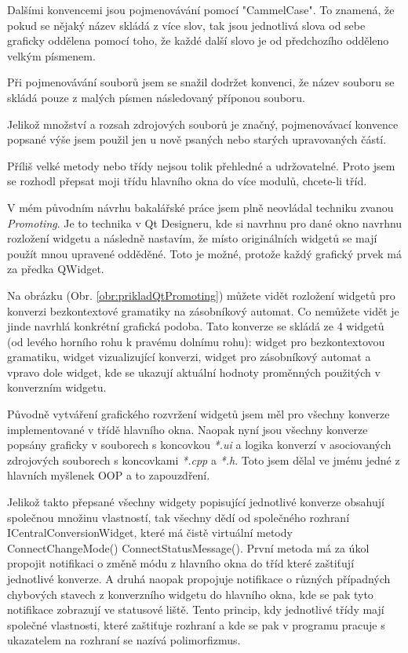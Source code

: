 Dalšími konvencemi jsou pojmenovávání pomocí "CammelCase". To znamená, že pokud se nějaký název skládá z více slov, tak jsou jednotlivá slova od sebe graficky oddělena pomocí toho, že každé další slovo je od předchozího odděleno velkým písmenem.

Při pojmenovávání souborů jsem se snažil dodržet konvenci, že název souboru se skládá pouze z malých písmen následovaný příponou souboru.

Jelikož množství a rozsah zdrojových souborů je značný, pojmenovávací konvence popsané výše jsem použil jen u nově psaných nebo starých upravovaných částí. 


Příliš velké metody nebo třídy nejsou tolik přehledné a udržovatelné. Proto jsem se rozhodl přepsat moji třídu hlavního okna do více modulů, chcete-li tříd.

V mém původním návrhu bakalářské práce jsem plně neovládal techniku zvanou \textit{Promoting}. Je to technika v Qt Designeru, kde si navrhnu pro dané okno navrhnu rozložení widgetu a následně nastavím, že místo originálních widgetů se mají použít mnou upravené odděděné. Toto je možné, protože každý grafický prvek má za předka QWidget.


Na obrázku (Obr. \ref{obr:prikladQtPromoting}) můžete vidět rozložení widgetů pro konverzi bezkontextové gramatiky na zásobníkový automat. Co nemůžete vidět je jinde navrhlá konkrétní grafická podoba. Tato konverze se skládá ze 4 widgetů (od levého horního rohu k pravému dolnímu rohu): widget pro bezkontextovou gramatiku, widget vizualizující konverzi, widget pro zásobníkový automat a vpravo dole widget, kde se ukazují aktuální hodnoty proměnných použitých v konverzním widgetu.

Původně vytváření grafického rozvržení widgetů jsem měl pro všechny konverze implementované v třídě hlavního okna. Naopak nyní jsou všechny konverze popsány graficky v souborech s koncovkou \textit{*.ui} a logika konverzí v asociovaných zdrojových souborech s koncovkami \textit{*.cpp} a \textit{*.h}. Toto jsem dělal ve jménu jedné z hlavních myšlenek OOP a to zapouzdření.

Jelikož takto přepsané všechny widgety popisující jednotlivé konverze obsahují společnou množinu vlastností, tak všechny dědí od společného rozhraní ICentralConversionWidget, které má čistě virtuální metody ConnectChangeMode() ConnectStatusMessage(). První metoda má za úkol propojit notifikaci o změně módu z hlavního okna do tříd které zaštiťují jednotlivé konverze. A druhá naopak propojuje notifikace o různých případných chybových stavech z konverzního widgetu do hlavního okna, kde se pak tyto notifikace zobrazují ve statusové liště. Tento princip, kdy jednotlivé třídy mají společné vlastnosti, které zaštiťuje rozhraní a kde se pak v programu pracuje s ukazatelem na rozhraní se nazívá polimorfizmus.

